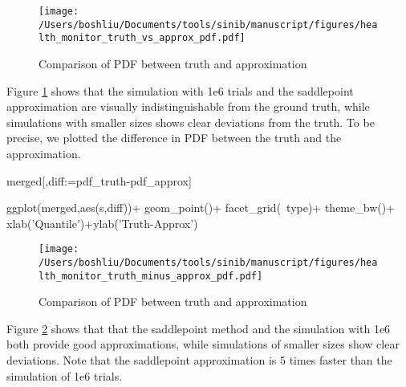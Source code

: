 
\begin{figure}[h]
\texttt{[image: /Users/boshliu/Documents/tools/sinib/manuscript/figures/health\_monitor\_truth\_vs\_approx\_pdf.pdf]}
\caption{Comparison of PDF between truth and approximation}
\label{fig:5}
\end{figure}

Figure \ref{fig:5} shows that the simulation with 1e6 trials and the saddlepoint approximation are visually indistinguishable from the ground truth, while simulations with smaller sizes shows clear deviations from the truth. To be precise, we plotted the difference in PDF between the truth and the approximation.

\begin{example}
merged[,diff:=pdf_truth-pdf_approx]

ggplot(merged,aes(s,diff))+
	geom_point()+
	facet_grid(~type)+
	theme_bw()+
	xlab('Quantile')+ylab('Truth-Approx')
\end{example}

\begin{figure}[h]
\texttt{[image: /Users/boshliu/Documents/tools/sinib/manuscript/figures/health\_monitor\_truth\_minus\_approx\_pdf.pdf]}
\caption{Comparison of PDF between truth and approximation}
\label{fig:6}
\end{figure}

Figure \ref{fig:6} shows that that the saddlepoint method and the simulation with 1e6 both provide good approximations, while simulations of smaller sizes show clear deviations. Note that the saddlepoint approximation is 5 times faster than the simulation of 1e6 trials.


